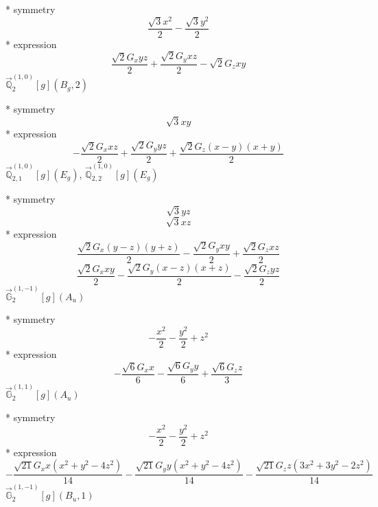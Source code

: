 \documentclass[fleqn,8pt]{jsarticle}
\begin{document}
\noindent\quad ** symmetry
\begin{dmath*}
\frac{\sqrt{3} x^{2}}{2} - \frac{\sqrt{3} y^{2}}{2}
\end{dmath*}
\noindent\quad ** expression
\begin{dmath*}
\frac{\sqrt{2} G_{x} y z}{2} + \frac{\sqrt{2} G_{y} x z}{2} - \sqrt{2} G_{z} x y
\end{dmath*}
\noindent\quad $\vec{\mathbb{Q}}_{2}^{(1,0)}[g](B_{g},2)$

\noindent\quad ** symmetry
\begin{dmath*}
\sqrt{3} x y
\end{dmath*}
\noindent\quad ** expression
\begin{dmath*}
- \frac{\sqrt{2} G_{x} x z}{2} + \frac{\sqrt{2} G_{y} y z}{2} + \frac{\sqrt{2} G_{z} \left(x - y\right) \left(x + y\right)}{2}
\end{dmath*}
\noindent\quad $\vec{\mathbb{Q}}_{2,1}^{(1,0)}[g](E_{g})$, $\vec{\mathbb{Q}}_{2,2}^{(1,0)}[g](E_{g})$

\noindent\quad ** symmetry
\begin{dmath*}
\sqrt{3} y z
\end{dmath*}
\begin{dmath*}
\sqrt{3} x z
\end{dmath*}
\noindent\quad ** expression
\begin{dmath*}
\frac{\sqrt{2} G_{x} \left(y - z\right) \left(y + z\right)}{2} - \frac{\sqrt{2} G_{y} x y}{2} + \frac{\sqrt{2} G_{z} x z}{2}
\end{dmath*}
\begin{dmath*}
\frac{\sqrt{2} G_{x} x y}{2} - \frac{\sqrt{2} G_{y} \left(x - z\right) \left(x + z\right)}{2} - \frac{\sqrt{2} G_{z} y z}{2}
\end{dmath*}
\noindent\quad $\vec{\mathbb{G}}_{2}^{(1,-1)}[g](A_{u})$

\noindent\quad ** symmetry
\begin{dmath*}
- \frac{x^{2}}{2} - \frac{y^{2}}{2} + z^{2}
\end{dmath*}
\noindent\quad ** expression
\begin{dmath*}
- \frac{\sqrt{6} G_{x} x}{6} - \frac{\sqrt{6} G_{y} y}{6} + \frac{\sqrt{6} G_{z} z}{3}
\end{dmath*}
\noindent\quad $\vec{\mathbb{G}}_{2}^{(1,1)}[g](A_{u})$

\noindent\quad ** symmetry
\begin{dmath*}
- \frac{x^{2}}{2} - \frac{y^{2}}{2} + z^{2}
\end{dmath*}
\noindent\quad ** expression
\begin{dmath*}
- \frac{\sqrt{21} G_{x} x \left(x^{2} + y^{2} - 4 z^{2}\right)}{14} - \frac{\sqrt{21} G_{y} y \left(x^{2} + y^{2} - 4 z^{2}\right)}{14} - \frac{\sqrt{21} G_{z} z \left(3 x^{2} + 3 y^{2} - 2 z^{2}\right)}{14}
\end{dmath*}
\noindent\quad $\vec{\mathbb{G}}_{2}^{(1,-1)}[g](B_{u},1)$
\end{document}
